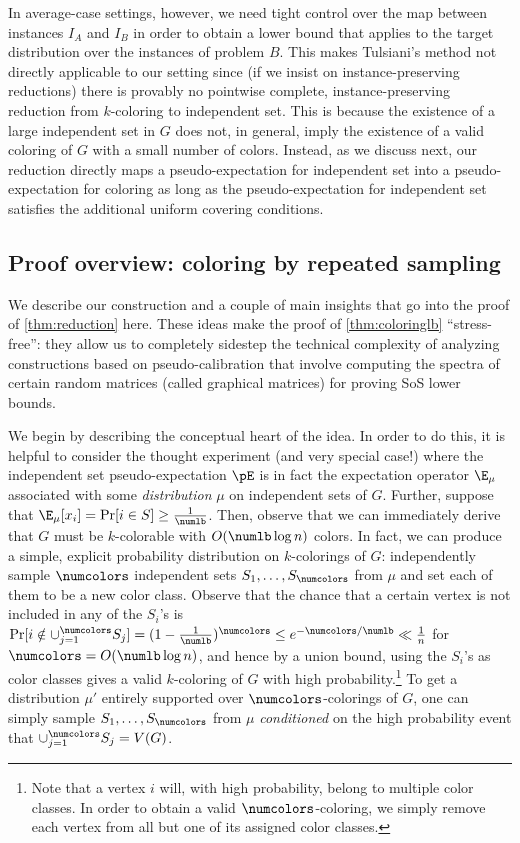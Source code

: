 In average-case settings, however, we need tight control over the map between instances $I_A$ and $I_B$ in order to obtain a lower bound that applies to the target distribution over the instances of problem $B$. This makes Tulsiani's method not directly applicable to our setting since (if we insist on instance-preserving reductions) there is provably no pointwise complete, instance-preserving reduction from $k$-coloring to independent set. This is because the existence of a large independent set in $G$ does not, in general, imply the existence of a valid coloring of $G$ with a small number of colors. Instead, as we discuss next, our reduction directly maps a pseudo-expectation for independent set into a pseudo-expectation for coloring as long as the pseudo-expectation for independent set satisfies the additional uniform covering conditions.  

\subsection{Proof overview: coloring by repeated sampling} 
We describe our construction and a couple of main insights that go into the proof of \cref{thm:reduction} here. These ideas make the proof of \cref{thm:coloringlb} ``stress-free'': they allow us to completely sidestep the technical complexity of analyzing constructions based on pseudo-calibration that involve computing the spectra of certain random matrices (called graphical matrices) for proving SoS lower bounds. 

 We begin by describing the conceptual heart of the idea. In order to do this, it is helpful to consider the thought experiment (and very special case!) where the independent set pseudo-expectation $\pE$ is in fact the expectation operator  $\E_{\mu}$ associated with some \emph{distribution} $\mu$ on independent sets of $G$. Further, suppose that $\E_{\mu}[x_i] = \Pr[i \in S] \geq \frac{1}{\numlb}$. Then, observe that we can immediately derive that $G$ must be $k$-colorable with $O(\numlb \log n)$ colors. In fact, we can produce a simple, explicit probability distribution on $k$-colorings of $G$: independently sample $\numcolors$ independent sets $S_1, \dots, S_{\numcolors}$ from $\mu$ and set each of them to be a new color class. Observe that the chance that a certain vertex is not included in any of the $S_i$'s is $\Pr[i \notin \cup_{j = 1}^{\numcolors} S_j] = (1 - \frac{1}{\numlb})^{\numcolors} \leq e^{-\numcolors/\numlb} \ll \frac{1}{n}$ for $\numcolors = O(\numlb \log n)$, and hence by a union bound, using the $S_i$'s as color classes gives a valid $k$-coloring of $G$ with high probability.\footnote{Note that a vertex $i$ will, with high probability, belong to multiple color classes. In order to obtain a valid $\numcolors$-coloring, we simply remove each vertex from all but one of its assigned color classes.} To get a distribution $\mu'$ entirely supported over $\numcolors$-colorings of $G$, one can simply sample $S_1, \dots, S_{\numcolors}$ from $\mu$ \emph{conditioned} on the high probability event that $\cup_{j = 1}^{\numcolors} S_j = V(G)$. 

